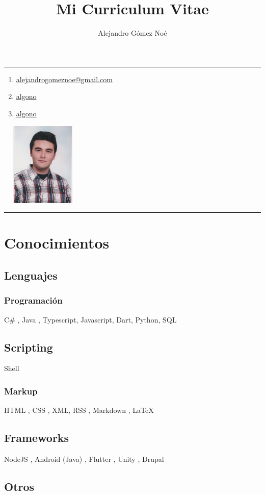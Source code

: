 \documentclass[letterpaper, 12pt]{article}
\makeatletter
\newcommand{\name}{
    {\huge\bfseries\MakeUppercase{\theauthor}}

    \rule{.65\textwidth}{.4pt}
}
\renewcommand{\maketitle}{
    \begin{center}

        \name

    \end{center}
}
\newcommand{\emailnoref}{alejandrogomeznoe@gmail.com}
\newcommand{\email}{\href{mailto:\emailnoref}{\emailnoref}}
\newcommand{\githubpage}{\href{https://github.com/algono}{algono}}
\newcommand{\gitlabpage}{\href{https://gitlab.com/algono}{algono}}
\newcommand{\contactinfo}{
    \begin{minipage}[c]{.7\textwidth}
        \begin{large}
            \begin{enumerate}[labelsep=.5em,itemsep=12pt]
                \item [\faEnvelope] \email
                \item [\faGithub] \githubpage
                \item [\faGitlab] \gitlabpage
            \end{enumerate}
        \end{large}
    \end{minipage}
    \begin{minipage}[r]{.2\textwidth}
        \includegraphics[width=4cm,height=4cm,keepaspectratio]{mi-foto.jpg}
    \end{minipage}
}
\makeatother
\begin{document}
    
    \title{Mi Curriculum Vitae}
    \author{Alejandro Gómez Noé}
    
    \maketitle

    \vspace{12pt}

    \contactinfo

    \vspace{8pt}

    \rule{.9\textwidth}{.4pt}

    \section{Conocimientos}

    \subsection{Lenguajes}

    \subsubsection{Programación}

    C\# \faWindows, Java \faCoffee, Typescript, Javascript, Dart, Python, SQL \faDatabase

    \subsection{Scripting}

    Shell \faLinux

    \subsubsection{Markup}

    HTML , CSS , XML, RSS \faRss, Markdown \faEdit, \LaTeX

    \subsection{Frameworks}

    NodeJS \faServer, Android (Java) \faAndroid, Flutter \faMobile, Unity \faGamepad, Drupal \faDrupal

    \subsection{Otros}
\end{document}
